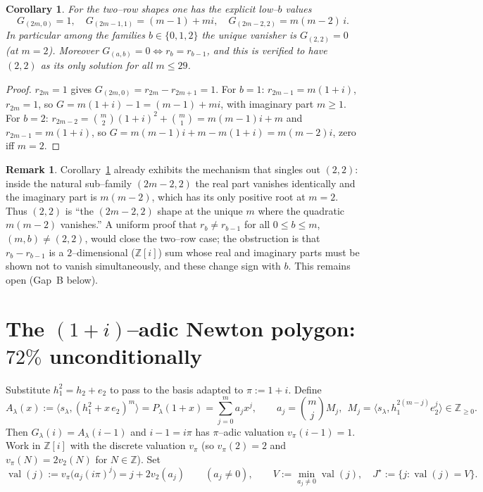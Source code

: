 \documentclass[11pt]{article}
\newtheorem{corollary}{Corollary}
\theoremstyle{definition}
\newtheorem{remark}{Remark}
\DeclareMathOperator{\val}{val}
\newcommand{\la}{\lambda}
\newcommand{\Z}{\mathbb{Z}}
\newcommand{\sll}{s_\la}
\newcommand{\inner}[2]{\langle #1,#2\rangle}
\begin{document}
\begin{corollary}\label{cor:tworow-low}
For the two--row shapes one has the explicit low--$b$ values
\[
G_{(2m,0)}=1,\quad G_{(2m-1,1)}=(m-1)+mi,\quad G_{(2m-2,2)}=m(m-2)\,i .
\]
In particular among the families $b\in\{0,1,2\}$ the unique vanisher is
$G_{(2,2)}=0$ (at $m=2$).  Moreover $G_{(a,b)}=0\iff r_b=r_{b-1}$, and this is
verified to have $(2,2)$ as its only solution for all $m\le 29$.
\end{corollary}
\begin{proof}
$r_{2m}=1$ gives $G_{(2m,0)}=r_{2m}-r_{2m+1}=1$.  For $b=1$:
$r_{2m-1}=m(1+i)$, $r_{2m}=1$, so $G=m(1+i)-1=(m-1)+mi$, with imaginary part
$m\ge1$.  For $b=2$: $r_{2m-2}=\binom m2(1+i)^2+\binom m1=m(m-1)i+m$ and
$r_{2m-1}=m(1+i)$, so $G=m(m-1)i+m-m(1+i)=m(m-2)i$, zero iff $m=2$.
\end{proof}

\begin{remark}
Corollary~\ref{cor:tworow-low} already exhibits the mechanism that singles out
$(2,2)$: inside the natural sub--family $(2m-2,2)$ the real part vanishes
identically and the imaginary part is $m(m-2)$, which has its only positive root
at $m=2$.  Thus $(2,2)$ is ``the $(2m-2,2)$ shape at the unique $m$ where the
quadratic $m(m-2)$ vanishes.''  A uniform proof that $r_b\ne r_{b-1}$ for all
$0\le b\le m$, $(m,b)\ne(2,2)$, would close the two--row case; the obstruction is
that $r_b-r_{b-1}$ is a $2$--dimensional ($\mathbb Z[i]$) sum whose real and
imaginary parts must be shown not to vanish simultaneously, and these change sign
with $b$.  This remains open (Gap~B below).
\end{remark}

\section{The $(1+i)$--adic Newton polygon: $72\%$ unconditionally}
Substitute $h_1^2=h_2+e_2$ to pass to the basis adapted to $\pi:=1+i$.  Define
\begin{equation}\label{eq:A}
A_\la(x):=\inner{\sll}{(h_1^2+x\,e_2)^m}=P_\la(1+x)=\sum_{j=0}^m a_j x^j,
\qquad a_j=\binom mj M_j,\ \ M_j=\inner{\sll}{h_1^{2(m-j)}e_2^j}\in\Z_{\ge0}.
\end{equation}
Then $G_\la(i)=A_\la(i-1)$ and $i-1=i\pi$ has $\pi$--adic valuation $v_\pi(i-1)=1$.
Work in $\Z[i]$ with the discrete valuation $v_\pi$ (so $v_\pi(2)=2$ and
$v_\pi(N)=2v_2(N)$ for $N\in\Z$).  Set
\[
\val(j):=v_\pi\bigl(a_j(i\pi)^j\bigr)=j+2v_2(a_j)\qquad(a_j\ne0),
\qquad V:=\min_{a_j\ne0}\val(j),\quad J^\star:=\{j:\val(j)=V\}.
\]
\end{document}
